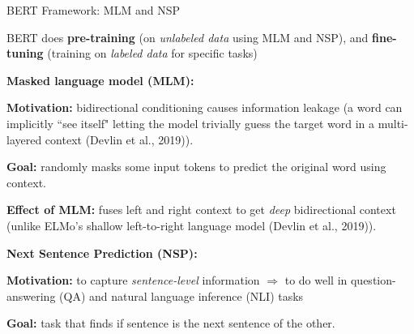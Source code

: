 \begin{frame}{BERT Framework: MLM and NSP}

\linespread{0.3} 

BERT does \textbf{pre-training} (on \emph{unlabeled data} using MLM and NSP), and \textbf{fine-tuning} (training on \emph{labeled data} for specific tasks)


{\small \textbf{Masked language model (MLM): }}
    \begin{itemizeSpaced}{5pt}
        \pinkbox \textbf{Motivation:} bidirectional conditioning causes information {\color{MediumVioletRed} leakage} (a word can implicitly ``see itself" letting the model trivially guess the target word in a multi-layered context (Devlin et al., 2019)). 
        
        \item \textbf{Goal: } {\color{MediumVioletRed}randomly masks} some input tokens to predict the original word using context. 
        
        \item \textbf{Effect of MLM: }  {\color{MediumVioletRed}fuses left and right context} to get  {\color{MediumVioletRed}\emph{deep}} bidirectional context (unlike ELMo's  {\color{MediumVioletRed}shallow} left-to-right language model (Devlin et al., 2019)).  
    \end{itemizeSpaced}
    
{\small \textbf{Next Sentence Prediction (NSP):}}
    \begin{itemizeSpaced}{5pt}
        \pinkbox \textbf{Motivation: }  {\color{MediumVioletRed} to capture \emph{sentence-level} information} $\Rightarrow$ to do well in question-answering (QA) and natural language inference (NLI) tasks
        
        
        \item \textbf{Goal: } task that finds if sentence is the next sentence of the other. 
        
    \end{itemizeSpaced}
    
\end{frame}


